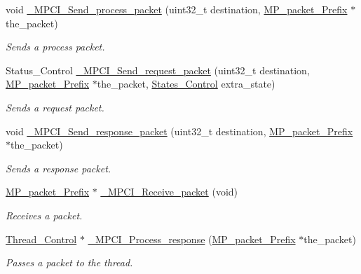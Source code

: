 \begin{DoxyCompactItemize}
void \mbox{\hyperlink{group__RTEMSScoreMPCI_ga02e1e38a1e6a9d3b6488058c89ac96a1}{\+\_\+\+M\+P\+C\+I\+\_\+\+Send\+\_\+process\+\_\+packet}} (uint32\+\_\+t destination, \mbox{\hyperlink{structMP__packet__Prefix}{M\+P\+\_\+packet\+\_\+\+Prefix}} $\ast$the\+\_\+packet)
\begin{DoxyCompactList}\small\item\em Sends a process packet. \end{DoxyCompactList}\item 
Status\+\_\+\+Control \mbox{\hyperlink{group__RTEMSScoreMPCI_gaa7cccdabe9e7db7495e1d8bd12e6bcb0}{\+\_\+\+M\+P\+C\+I\+\_\+\+Send\+\_\+request\+\_\+packet}} (uint32\+\_\+t destination, \mbox{\hyperlink{structMP__packet__Prefix}{M\+P\+\_\+packet\+\_\+\+Prefix}} $\ast$the\+\_\+packet, \mbox{\hyperlink{group__RTEMSScoreStates_gaeebbea0bfca162709b124fd519cf99d3}{States\+\_\+\+Control}} extra\+\_\+state)
\begin{DoxyCompactList}\small\item\em Sends a request packet. \end{DoxyCompactList}\item 
void \mbox{\hyperlink{group__RTEMSScoreMPCI_ga1623ab44f2cfb10c69b0f62674e53f1f}{\+\_\+\+M\+P\+C\+I\+\_\+\+Send\+\_\+response\+\_\+packet}} (uint32\+\_\+t destination, \mbox{\hyperlink{structMP__packet__Prefix}{M\+P\+\_\+packet\+\_\+\+Prefix}} $\ast$the\+\_\+packet)
\begin{DoxyCompactList}\small\item\em Sends a response packet. \end{DoxyCompactList}\item 
\mbox{\hyperlink{structMP__packet__Prefix}{M\+P\+\_\+packet\+\_\+\+Prefix}} $\ast$ \mbox{\hyperlink{group__RTEMSScoreMPCI_ga053f924dabe674cd71718615990e408c}{\+\_\+\+M\+P\+C\+I\+\_\+\+Receive\+\_\+packet}} (void)
\begin{DoxyCompactList}\small\item\em Receives a packet. \end{DoxyCompactList}\item 
\mbox{\hyperlink{struct__Thread__Control}{Thread\+\_\+\+Control}} $\ast$ \mbox{\hyperlink{group__RTEMSScoreMPCI_gae2df57913a498a0305315a2fb6cf12fb}{\+\_\+\+M\+P\+C\+I\+\_\+\+Process\+\_\+response}} (\mbox{\hyperlink{structMP__packet__Prefix}{M\+P\+\_\+packet\+\_\+\+Prefix}} $\ast$the\+\_\+packet)
\begin{DoxyCompactList}\small\item\em Passes a packet to the thread. \end{DoxyCompactList}\item 

\end{DoxyCompactItemize}
